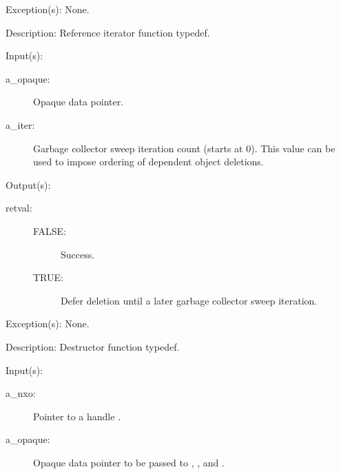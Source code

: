 \begin{capi}
\begin{capilist}
	\item[Exception(s): ] None.
	\item[Description: ]
		Reference iterator function typedef.
	\end{capilist}
\label{cw_nxo_handle_delete_t}
	\begin{capilist}
	\item[Input(s): ]
		\begin{description}\item[]
		\item[a\_opaque: ]
			Opaque data pointer.
		\item[a\_iter: ]
			Garbage collector sweep iteration count (starts at 0).
			This value can be used to impose ordering of dependent
			object deletions.
		\end{description}
	\item[Output(s): ]
		\begin{description}\item[]
		\item[retval: ]
			\begin{description}\item[]
			\item[FALSE: ] Success.
			\item[TRUE: ] Defer deletion until a later garbage
			collector sweep iteration.
			\end{description}
		\end{description}
	\item[Exception(s): ] None.
	\item[Description: ]
		Destructor function typedef.
	\end{capilist}
\label{nxo_handle_new}
	\begin{capilist}
	\item[Input(s): ]
		\begin{description}\item[]
		\item[a\_nxo: ]
			Pointer to a handle .
		\item[a\_opaque: ]
			Opaque data pointer to be passed to ,
			, and .

\end{description}
\end{capilist}
\end{capi}
